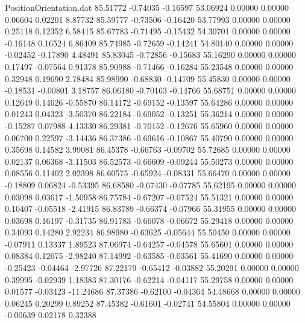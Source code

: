 \begin{filecontents}{PositionOrientation.dat}
  85.51772   -0.74035   -0.16597    53.06924    0.00000    0.00000    0.06604    0.02201    8.87732
  85.59777   -0.73506   -0.16420    53.77993    0.00000    0.00000    0.25118    0.12352    6.58415
  85.67783   -0.71495   -0.15432    54.30701    0.00000    0.00000   -0.16148    0.16524    6.86409
  85.74985   -0.72659   -0.14241    54.80140    0.00000    0.00000   -0.02452   -0.17890    4.48491
  85.83045   -0.72856   -0.15683    55.16290    0.00000    0.00000    0.17497   -0.07564    0.91378
  85.90988   -0.71466   -0.16284    55.23548    0.00000    0.00000    0.32948    0.19690    2.78484
  85.98990   -0.68830   -0.14709    55.45830    0.00000    0.00000   -0.18531   -0.00801    3.18757
  86.06180   -0.70163   -0.14766    55.68751    0.00000    0.00000    0.12649    0.14626   -0.55870
  86.14172   -0.69152   -0.13597    55.64286    0.00000    0.00000    0.01243    0.04323   -3.50370
  86.22184   -0.69052   -0.13251    55.36214    0.00000    0.00000   -0.15287    0.07988    4.13330
  86.29381   -0.70152   -0.12676    55.65960    0.00000    0.00000    0.06700    0.22597   -3.14436
  86.37386   -0.69616   -0.10867    55.40790    0.00000    0.00000    0.35698    0.14582    3.99081
  86.45378   -0.66763   -0.09702    55.72685    0.00000    0.00000    0.02137    0.06368   -3.11503
  86.52573   -0.66609   -0.09244    55.50273    0.00000    0.00000    0.08556    0.11402    2.02398
  86.60575   -0.65924   -0.08331    55.66470    0.00000    0.00000   -0.18809    0.06824   -0.53395
  86.68580   -0.67430   -0.07785    55.62195    0.00000    0.00000    0.03098    0.03617   -1.50958
  86.75784   -0.67207   -0.07524    55.51321    0.00000    0.00000    0.10407   -0.05518   -2.41915
  86.83789   -0.66374   -0.07966    55.31955    0.00000    0.00000    0.03698    0.16197   -0.31735
  86.91783   -0.66078   -0.06672    55.29418    0.00000    0.00000    0.34093    0.14280    2.92234
  86.98980   -0.63625   -0.05644    55.50450    0.00000    0.00000   -0.07911    0.13337    1.89523
  87.06974   -0.64257   -0.04578    55.65601    0.00000    0.00000    0.08384    0.12675   -2.98240
  87.14992   -0.63585   -0.03561    55.41690    0.00000    0.00000   -0.25423   -0.04464   -2.97726
  87.22179   -0.65412   -0.03882    55.20291    0.00000    0.00000    0.39995   -0.02939    1.18383
  87.30176   -0.62214   -0.04117    55.29758    0.00000    0.00000    0.01577   -0.03423  -11.24686
  87.37386   -0.62100   -0.04364    54.48668    0.00000    0.00000    0.06245    0.20299    0.89252
  87.45382   -0.61601   -0.02741    54.55804    0.00000    0.00000   -0.00639    0.02178    0.32388

\end{filecontents}
